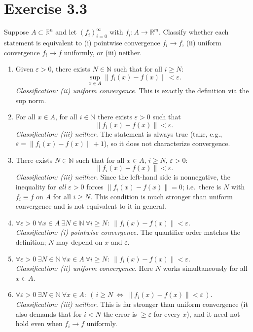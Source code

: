 

\section*{Exercise 3.3}
Suppose $A\subset\mathbb{R}^n$ and let $(f_i)_{i=0}^\infty$ with $f_i:A\to\mathbb{R}^m$.
Classify whether each statement is equivalent to (i) pointwise convergence $f_i\to f$,
(ii) uniform convergence $f_i\to f$ uniformly, or (iii) neither.

\begin{enumerate}
\renewcommand\labelenumi{(\alph{enumi})}

\item Given $\varepsilon>0$, there exists $N\in\mathbb{N}$ such that for all $i\ge N$:
\[
\sup_{x\in A}\|f_i(x)-f(x)\|<\varepsilon.
\]
\textit{Classification: (ii) uniform convergence.} This is exactly the definition via the sup norm.

\item For all $x\in A$, for all $i\in\mathbb{N}$ there exists $\varepsilon>0$ such that
\[
\|f_i(x)-f(x)\|<\varepsilon.
\]
\textit{Classification: (iii) neither.} The statement is always true (take, e.g., $\varepsilon=\|f_i(x)-f(x)\|+1$), so it does not characterize convergence.

\item There exists $N\in\mathbb{N}$ such that for all $x\in A$, $i\ge N$, $\varepsilon>0$:
\[
\|f_i(x)-f(x)\|<\varepsilon.
\]
\textit{Classification: (iii) neither.} Since the left-hand side is nonnegative, the inequality for \emph{all} $\varepsilon>0$ forces $\|f_i(x)-f(x)\|=0$; i.e.\ there is $N$ with $f_i\equiv f$ on $A$ for all $i\ge N$. This condition is much stronger than uniform convergence and is not equivalent to it in general.

\item[\textit{*}d)] $\forall\varepsilon>0\ \forall x\in A\ \exists N\in\mathbb{N}\ \forall i\ge N:\ \|f_i(x)-f(x)\|<\varepsilon$.\\
\textit{Classification: (i) pointwise convergence.} The quantifier order matches the definition; $N$ may depend on $x$ and $\varepsilon$.

\item[\textit{*}e)] $\forall\varepsilon>0\ \exists N\in\mathbb{N}\ \forall x\in A\ \forall i\ge N:\ \|f_i(x)-f(x)\|<\varepsilon$.\\
\textit{Classification: (ii) uniform convergence.} Here $N$ works simultaneously for all $x\in A$.

\item[\textit{*}f)] $\forall\varepsilon>0\ \exists N\in\mathbb{N}\ \forall x\in A:\ (\,i\ge N\ \Leftrightarrow\ \|f_i(x)-f(x)\|<\varepsilon\,)$.\\
\textit{Classification: (iii) neither.} This is far stronger than uniform convergence (it also demands that for $i<N$ the error is $\ge\varepsilon$ for every $x$), and it need not hold even when $f_i\to f$ uniformly.
\end{enumerate}


